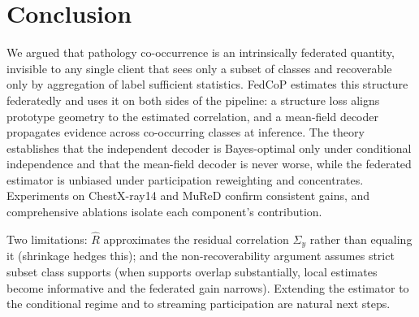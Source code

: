 \documentclass[10pt,twocolumn,letterpaper]{article}
\theoremstyle{definition}
\newcommand{\Rhat}{\widehat{R}}
\newcommand{\Sigmay}{\Sigma_{y}}
\begin{document}
\section{Conclusion}

We argued that pathology co-occurrence is an intrinsically federated quantity, invisible to any single client that sees only a subset of classes and recoverable only by aggregation of label sufficient statistics. FedCoP estimates this structure federatedly and uses it on both sides of the pipeline: a structure loss aligns prototype geometry to the estimated correlation, and a mean-field decoder propagates evidence across co-occurring classes at inference. The theory establishes that the independent decoder is Bayes-optimal only under conditional independence and that the mean-field decoder is never worse, while the federated estimator is unbiased under participation reweighting and concentrates. Experiments on ChestX-ray14 and MuReD confirm consistent gains, and comprehensive ablations isolate each component's contribution.

Two limitations: $\Rhat$ approximates the residual correlation $\Sigmay$ rather than equaling it (shrinkage hedges this); and the non-recoverability argument assumes strict subset class supports (when supports overlap substantially, local estimates become informative and the federated gain narrows). Extending the estimator to the conditional regime and to streaming participation are natural next steps.

{
    \small
    
    
}
\end{document}
